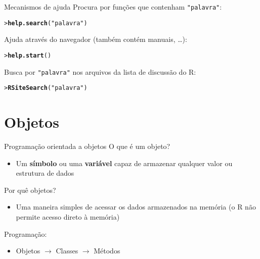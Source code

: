 \documentclass[10pt,handout]{beamer}\usepackage{graphicx, color}
\makeatletter
\newcommand{\hlfunctioncall}[1]{\textcolor[rgb]{0,0,0.545098039215686}{\textbf{#1}}}%
\newcommand{\hlstring}[1]{\textcolor[rgb]{0.282352941176471,0.23921568627451,0.545098039215686}{#1}}%
\newenvironment{kframe}{%
 \def\at@end@of@kframe{}%
 \ifinner\ifhmode%
  \def\at@end@of@kframe{\end{minipage}}%
  \begin{minipage}{\columnwidth}%
 \fi\fi%
 \def\FrameCommand##1{\hskip\@totalleftmargin \hskip-\fboxsep
 \colorbox{shadecolor}{##1}\hskip-\fboxsep
     \hskip-\linewidth \hskip-\@totalleftmargin \hskip\columnwidth}%
 \MakeFramed {\advance\hsize-\width
   \@totalleftmargin\z@ \linewidth\hsize
   \@setminipage}}%
 {\par\unskip\endMakeFramed%
 \at@end@of@kframe}
\newenvironment{knitrout}{}{} %
\makeatother
\begin{document}
\begin{frame}[fragile=singleslide]{Mecanismos de ajuda}
Procura por funções que contenham \texttt{"palavra"}:
\begin{knitrout}\small
{}\color{fgcolor}\begin{kframe}
\begin{alltt}
> \hlfunctioncall{help.search}(\hlstring{"palavra"})
\end{alltt}
\end{kframe}
\end{knitrout}

Ajuda através do navegador (também contém manuais, \ldots):
\begin{knitrout}\small
{}\color{fgcolor}\begin{kframe}
\begin{alltt}
> \hlfunctioncall{help.start}()
\end{alltt}
\end{kframe}
\end{knitrout}

Busca por \texttt{"palavra"} nos arquivos da lista de discussão do R:
\begin{knitrout}\small
{}\color{fgcolor}\begin{kframe}
\begin{alltt}
> \hlfunctioncall{RSiteSearch}(\hlstring{"palavra"})
\end{alltt}
\end{kframe}
\end{knitrout}

\end{frame}

\section{Objetos}

\begin{frame}[fragile=singleslide]{Programação orientada a objetos}
O que é um objeto?
\begin{itemize}
\item Um \textbf{símbolo} ou uma \textbf{variável} capaz de armazenar
  qualquer valor ou estrutura de dados
\end{itemize}
Por quê objetos?
\begin{itemize}
\item Uma maneira simples de acessar os dados armazenados na memória (o
  R não permite acesso direto à memória)
\end{itemize}
Programação:
\begin{itemize}
\item Objetos $\rightarrow$ Classes $\rightarrow$ Métodos
\end{itemize}
\end{frame}
\end{document}
